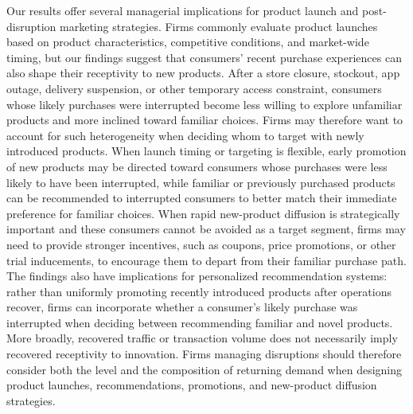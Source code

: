 \documentclass[11 pt]{article}
\begin{document}
Our results offer several managerial implications for product launch and post-disruption marketing strategies. Firms commonly evaluate product launches based on product characteristics, competitive conditions, and market-wide timing, but our findings suggest that consumers' recent purchase experiences can also shape their receptivity to new products. After a store closure, stockout, app outage, delivery suspension, or other temporary access constraint, consumers whose likely purchases were interrupted become less willing to explore unfamiliar products and more inclined toward familiar choices. Firms may therefore want to account for such heterogeneity when deciding whom to target with newly introduced products. When launch timing or targeting is flexible, early promotion of new products may be directed toward consumers whose purchases were less likely to have been interrupted, while familiar or previously purchased products can be recommended to interrupted consumers to better match their immediate preference for familiar choices. When rapid new-product diffusion is strategically important and these consumers cannot be avoided as a target segment, firms may need to provide stronger incentives, such as coupons, price promotions, or other trial inducements, to encourage them to depart from their familiar purchase path. The findings also have implications for personalized recommendation systems: rather than uniformly promoting recently introduced products after operations recover, firms can incorporate whether a consumer's likely purchase was interrupted when deciding between recommending familiar and novel products. More broadly, recovered traffic or transaction volume does not necessarily imply recovered receptivity to innovation. Firms managing disruptions should therefore consider both the level and the composition of returning demand when designing product launches, recommendations, promotions, and new-product diffusion strategies.
\end{document}
